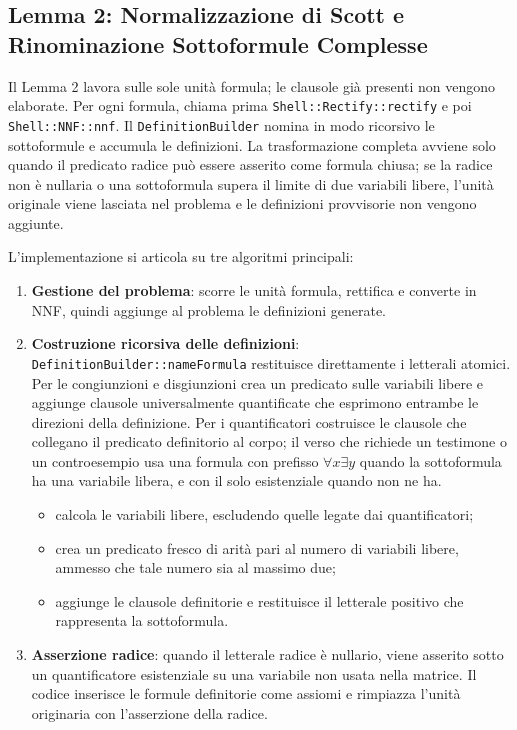 \subsection{Lemma 2: Normalizzazione di Scott e Rinominazione Sottoformule Complesse}
\label{subsec:lemma2_impl}

Il Lemma 2 lavora sulle sole unità formula; le clausole già presenti non vengono elaborate. Per ogni formula, chiama prima \texttt{Shell::Rectify::rectify} e poi \texttt{Shell::NNF::nnf}. Il \texttt{DefinitionBuilder} nomina in modo ricorsivo le sottoformule e accumula le definizioni. La trasformazione completa avviene solo quando il predicato radice può essere asserito come formula chiusa; se la radice non è nullaria o una sottoformula supera il limite di due variabili libere, l'unità originale viene lasciata nel problema e le definizioni provvisorie non vengono aggiunte.

L'implementazione si articola su tre algoritmi principali:
\begin{enumerate}
    \item \textbf{Gestione del problema}: scorre le unità formula, rettifica e converte in NNF, quindi aggiunge al problema le definizioni generate.
    
    \item \textbf{Costruzione ricorsiva delle definizioni}: \texttt{DefinitionBuilder::nameFormula} restituisce direttamente i letterali atomici. Per le congiunzioni e disgiunzioni crea un predicato sulle variabili libere e aggiunge clausole universalmente quantificate che esprimono entrambe le direzioni della definizione. Per i quantificatori costruisce le clausole che collegano il predicato definitorio al corpo; il verso che richiede un testimone o un controesempio usa una formula con prefisso $\forall x\exists y$ quando la sottoformula ha una variabile libera, e con il solo esistenziale quando non ne ha.
    \begin{itemize}
        \item calcola le variabili libere, escludendo quelle legate dai quantificatori;
        \item crea un predicato fresco di arità pari al numero di variabili libere, ammesso che tale numero sia al massimo due;
        \item aggiunge le clausole definitorie e restituisce il letterale positivo che rappresenta la sottoformula.
    \end{itemize}

    \item \textbf{Asserzione radice}: quando il letterale radice è nullario, viene asserito sotto un quantificatore esistenziale su una variabile non usata nella matrice. Il codice inserisce le formule definitorie come assiomi e rimpiazza l'unità originaria con l'asserzione della radice.
\end{enumerate}

